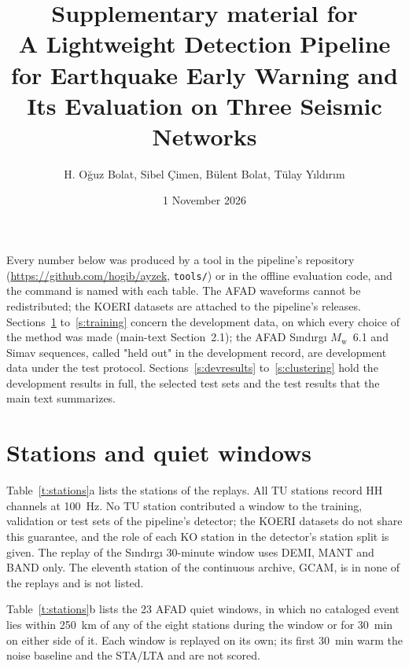 \documentclass[11pt,a4paper]{article}
\title{Supplementary material for\\[4pt]
  \large A Lightweight Detection Pipeline for Earthquake Early Warning and Its
  Evaluation on Three Seismic Networks}
\author{H. O\u{g}uz Bolat, Sibel \c{C}imen, B\"ulent Bolat, T\"ulay Y\i{}ld\i{}r\i{}m}
\date{1 November 2026}
\newcommand{\Mw}{$M_\mathrm{w}$}
\newcommand{\stalta}{STA/LTA}
\newcommand{\tool}[1]{\nolinkurl{#1}}
\begin{document}
\maketitle
\thispagestyle{fancy}

\noindent Every number below was produced by a tool in the pipeline's repository
(\url{https://github.com/hogib/ayzek}, \tool{tools/}) or in the offline
evaluation code, and the command is named with each table. The AFAD waveforms
cannot be redistributed; the KOERI datasets are attached to the pipeline's
releases. Sections~\ref{s:stations} to~\ref{s:training} concern the development
data, on which every choice of the method was made (main-text Section~2.1); the
AFAD S\i{}nd\i{}rg\i{} \Mw{}~6.1 and Simav sequences, called "held out" in the
development record, are development data under the test protocol.
Sections~\ref{s:devresults} to~\ref{s:clustering} hold the development results in
full, the selected test sets and the test results that the main text summarizes.

\tableofcontents

\section{Stations and quiet windows}\label{s:stations}

Table~\ref{t:stations}a lists the stations of the replays. All TU stations
record HH channels at 100~Hz. No TU station contributed a window to the
training, validation or test sets of the pipeline's detector; the KOERI datasets
do not share this guarantee, and the role of each KO station in the detector's
station split is given. The replay of the S\i{}nd\i{}rg\i{} 30-minute window uses DEMI, MANT and BAND only.
The eleventh station of the continuous archive, GCAM, is in none of the replays and is
not listed.

Table~\ref{t:stations}b lists the 23 AFAD quiet windows, in which no cataloged event lies within 250~km of any of the eight stations during the window or for 30~min
on either side of it. Each window is replayed on its own; its first 30~min warm
the noise baseline and the \stalta{} and are not scored.
\end{document}
